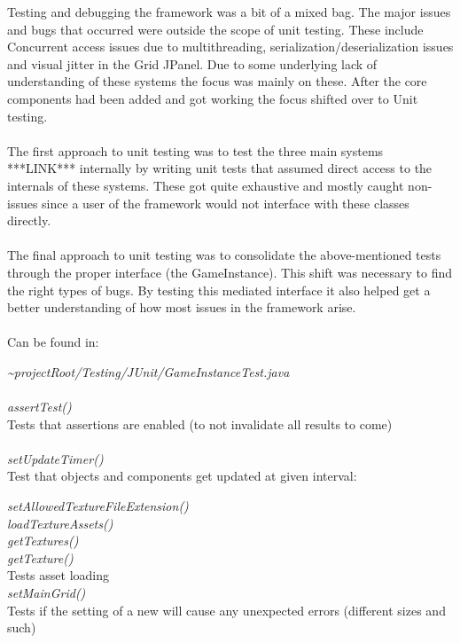 \documentclass[]{article}
\date{}
\begin{document}
Testing and debugging the framework was a bit of a mixed bag. The major
issues and bugs that occurred were outside the scope of unit testing.
These include Concurrent access issues due to multithreading,
serialization/deserialization issues and visual jitter in the Grid
JPanel. Due to some underlying lack of understanding of these systems
the focus was mainly on these. After the core components had been added
and got working the focus shifted over to Unit testing.
\\ \\
The first approach to unit testing was to test the three main systems
***LINK*** internally by writing unit tests that assumed direct access
to the internals of these systems. These got quite exhaustive and mostly
caught non-issues since a user of the framework would not interface with
these classes directly.
\\ \\
The final approach to unit testing was to consolidate the
above-mentioned tests through the proper interface (the GameInstance).
This shift was necessary to find the right types of bugs. By testing
this mediated interface it also helped get a better understanding of how
most issues in the framework arise.
\\ \\
Can be found in:

\emph{\textasciitilde{}projectRoot/Testing/JUnit/GameInstanceTest.java}
\\ \\
\emph{assertTest()}\\
\hspace*{10mm} Tests that assertions are enabled (to not invalidate all results to come)
\\ \\
\emph{setUpdateTimer()}\\
\hspace*{10mm} Test that objects and components get updated at given interval:

\emph{setAllowedTextureFileExtension()}\\
\emph{loadTextureAssets()}\\
\emph{getTextures()}\\
\emph{getTexture()}\\
\hspace*{10mm} Tests asset loading \\

\emph{setMainGrid()}\\
\hspace*{10mm} Tests if the setting of a new will cause any unexpected errors (different sizes and such)
\end{document}
